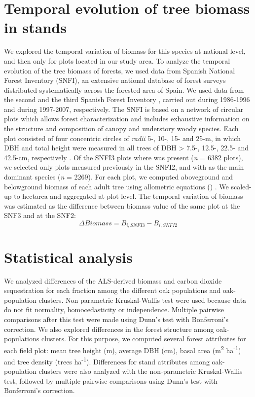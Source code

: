\section{Temporal evolution of tree biomass in \Qp stands}\label{sec:carbon:mat-temporal}
We explored the temporal variation of biomass for this species at national level, and then only for plots located in our study area. To analyze the temporal evolution of the tree biomass of \Qp forests, we used data from Spanish National Forest Inventory (SNFI), an extensive national database of forest surveys distributed systematically across the forested area of Spain. We used data from the second \autocites[SNFI2,][]{VillaescusaDiaz1998SegundoInventario} and the third Spanish Forest Inventory \autocites[SNFI3,][]{Villanueva2005TercerInventario}, carried out during 1986-1996 and during 1997-2007, respectively. The SNFI is based on a network of circular plots which allows forest characterization and includes exhaustive information on the structure and composition of canopy and understory woody species. Each plot consisted of four concentric circles of \emph{radii} 5-, 10-, 15- and 25-m, in which DBH and total height were measured in all trees of DBH \textgreater{} 7.5-, 12.5-, 22.5- and 42.5-cm, respectively \autocite{Alberdietal2016SpanishNational}. Of the SNFI3 plots where \Qp was present (\emph{n} = 6382 plots), we selected only plots measured previously in the SNFI2, and with \Qp as the main dominant species (\emph{n} = 2269). For each plot, we computed aboveground and belowground biomass of each \Qp adult tree using allometric equations () \autocite{RuizPeinadoetal2012BiomassModels}. We scaled-up to hectarea and aggregated at plot level. The temporal variation of biomass was estimated as the difference between biomass value of the same plot at the SNF3 and at the SNF2: \[\Delta Biomass = B_{i, SNFI3} - B_{i, SNFI2}\]

\section{Statistical analysis}\label{sec:carbon:analysis}
We analyzed differences of the ALS-derived biomass and carbon dioxide sequestration for each fraction among the different oak populations and oak-population clusters. Non parametric Kruskal-Wallis test were used because data do not fit normality, homocedasticity or independence. Multiple pairwise comparisons after this test were made using Dunn's test with Bonferroni's correction. We also explored differences in the forest structure among oak-populations clusters. For this purpose, we computed several forest attributes for each field plot: mean tree height (m), average DBH (cm), basal area (m\textsuperscript{2} ha\textsuperscript{-1}) and tree density (trees ha\textsuperscript{-1}). Differences for stand attributes among oak-population clusters were also analyzed with the non-parametric Kruskal-Wallis test, followed by multiple pairwise comparisons using Dunn's test with Bonferroni's correction. 


